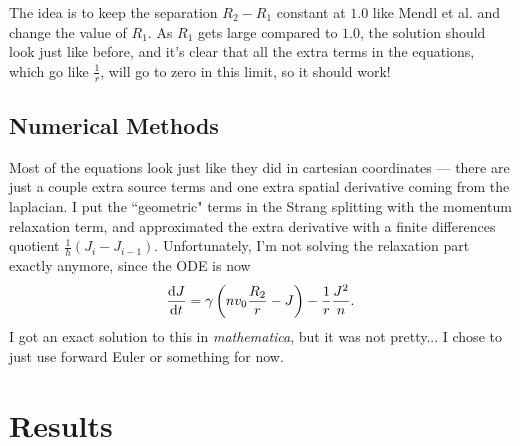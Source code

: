 \documentclass[12pt]{article}
\begin{document}
	The idea is to keep the separation $R_2 - R_1$ constant at $1.0$ like Mendl et al. and change the value of $R_1$.  As $R_1$ gets large compared to $1.0$, the solution should look just like before, and it's clear that all the extra terms in the equations, which go like $\frac{1}{r}$, will go to zero in this limit, so it should work!  
	
	\subsection{Numerical Methods}
	Most of the equations look just like they did in cartesian coordinates --- there are just a couple extra source terms and one extra spatial derivative coming from the laplacian.  I put the ``geometric" terms in the Strang splitting with the momentum relaxation term, and approximated the extra derivative with a finite differences quotient $\frac{1}{h}\left(J_i - J_{i-1}\right)$.
	Unfortunately, I'm not solving the relaxation part exactly anymore, since the ODE is now 
	$$\dv{J}{t} = \gamma \left(nv_0\frac{R_2}{r} - J\right) - \frac{1}{r}\frac{J^2}{n}.$$
	I got an exact solution to this in \textit{mathematica}, but it was not pretty... I chose to just use forward Euler or something for now.
	
	\section{Results}
\end{document}
